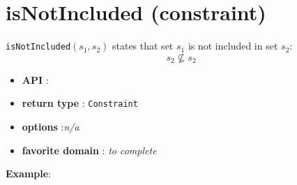 \label{isnotincluded}
\hypertarget{isnotincluded}{}

\section{isNotIncluded (constraint)}\label{isnotincluded:isnotincludedconstraint}\hypertarget{isnotincluded:isnotincludedconstraint}{}
\begin{notedef}
  \texttt{isNotIncluded}$(s_1,s_2)$ states that set $s_1$ is not included in set $s_2$:
 $$s_2\not\subseteq s_2$$
\end{notedef}

\begin{itemize}
	\item \textbf{API} : 
	\item \textbf{return type} : \texttt{Constraint}
	\item \textbf{options} :\emph{n/a}
	\item \textbf{favorite domain} : \emph{to complete}
\end{itemize}

\textbf{Example}:
 
